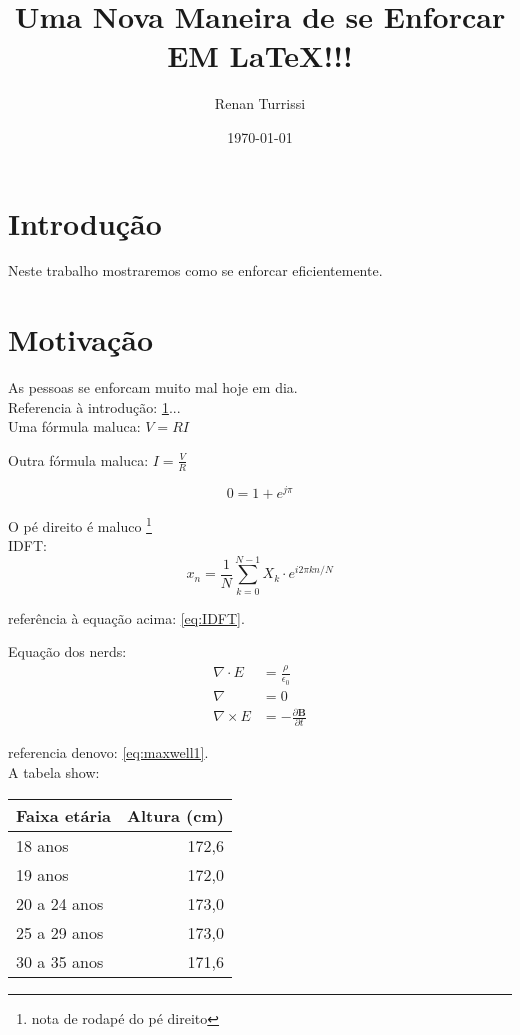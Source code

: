 \documentclass{article}
\author{Renan Turrissi}
\date{\today}
\title{Uma Nova Maneira de se Enforcar EM \LaTeX !!!}
\newcommand{\vetor}[1]{\textbf{#1}}
\begin{document}
\maketitle

\newpage

\section{Introdução}\label{sec:intro}
Neste trabalho mostraremos como se enforcar eficientemente.

\section{Motivação}\label{sec:motiv}
As pessoas se enforcam muito mal hoje em dia.\\
Referencia à introdução: \ref{sec:intro}...\\
Uma fórmula maluca: $ V =RI $   

\hfill

Outra fórmula maluca: $ I = \frac{V}{R} $

$$ 0 = 1+e^{j\pi}  $$


O pé direito é maluco
\footnote[2]{nota de rodapé do pé direito}\\


IDFT: 
\begin{equation} \label{eq:IDFT}
 x_n = \frac{1}{N}\sum_{k=0}^{N-1} X_k \cdot e^{i2\pi kn/N} 
\end{equation}

referência à equação acima: \ref{eq:IDFT}.

Equação dos nerds:
\begin{align}
\label{eq:maxwell1}
\nabla \cdot E & = \frac{\rho}{\epsilon_0} \\
\nabla  & = 0 \\
\nabla \times E & = -\frac{\partial \vetor{B}}{\partial t}
\end{align}

referencia denovo: \ref{eq:maxwell1}. \\

A tabela show:

\begin{table}[!htb] \label{tab:TabelaShow}
	\centering
	\begin{tabular}{|l|r|}
	\hline
	Faixa etária & Altura (cm) \\ \hline
	18 anos & 172,6 \\
	19 anos & 172,0 \\
	20 a 24 anos & 173,0 \\
	25 a 29 anos & 173,0 \\
	30 a 35 anos & 171,6 \\
	\hline
	\end{tabular}
\end{table}
\end{document}
